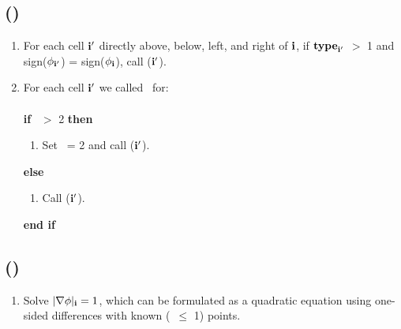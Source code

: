 \subsection{\UPDATE(\ib)}
\begin{enumerate}
\item For each cell ${\bf i}'$ directly above, below, left, and right of ${\bf i}$, if ${\tt{\bf type}}_{{\bf i}'}$ $>$ 1 and sign($\phi_{{\bf i}'}$) = sign($\phi_{\bf i}$), call \EVAL(${\bf i}'$).
\item For each cell ${\bf i}'$ we called \EVAL~for:\\ \\
{\bf if} \type~$>$ 2 {\bf then}
\begin{enumerate}
\item Set \type~= 2 and call \ADDNODE(${\bf i}'$).
\end{enumerate}
{\bf else}
\begin{enumerate}
\item Call \UPDATENODE(${\bf i}'$).
\end{enumerate}
{\bf end if}
\end{enumerate}
\subsection{\EVAL(\ib)}
\begin{enumerate}
\item Solve $|\nabla\phi|_{{\bf i}}=1$, which can be formulated as a quadratic equation using one-sided differences with known (\type~$\le$ 1) points.
\end{enumerate}
